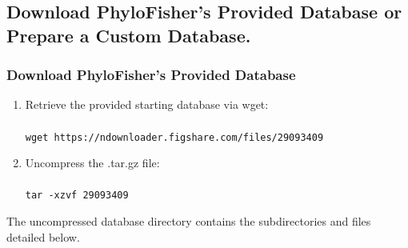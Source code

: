 \documentclass{article}
\def\code#1{\texttt{#1}}
\begin{document}
        \subsection{Download PhyloFisher’s Provided Database or Prepare a Custom Database.}
        \subsubsection{Download PhyloFisher’s Provided Database}
        \begin{enumerate}
            \item Retrieve the provided starting database via wget:
            \\\\
            \code{wget https://ndownloader.figshare.com/files/29093409}
            \item Uncompress the .tar.gz file:
            \\\\
            \code{tar -xzvf 29093409}
        \end{enumerate}
        The uncompressed database directory contains the subdirectories and files detailed below.
\end{document}
